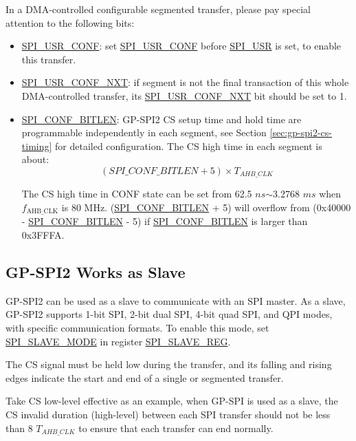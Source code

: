 \documentclass[main\_\_EN.tex]{subfiles}
\begin{document}
In a DMA-controlled configurable segmented transfer, please pay special attention to the following bits:
\begin{itemize}
    \item \hyperref[fielddesc:SPIUSRCONF]{SPI\_USR\_CONF}: set \hyperref[fielddesc:SPIUSRCONF]{SPI\_USR\_CONF} before \hyperref[fielddesc:SPIUSR]{SPI\_USR} is set, to enable this transfer.
    \item \hyperref[fielddesc:SPIUSRCONFNXT]{SPI\_USR\_CONF\_NXT}: if segment  is not the final transaction of this whole DMA-controlled transfer, its \hyperref[fielddesc:SPIUSRCONFNXT]{SPI\_USR\_CONF\_NXT} bit should be set to 1.
    \item \hyperref[fielddesc:SPICONFBITLEN]{SPI\_CONF\_BITLEN}: GP-SPI2 CS setup time and hold time are programmable independently in each segment, see Section \ref{sec:gp-spi2-cs-timing} for detailed configuration. The CS high time in each segment is about:
    \[
    (\hyperref[fielddesc:SPICONFBITLEN]{SPI\_CONF\_BITLEN} + 5) \times T_{AHB\_CLK}
    \]

The CS high time in CONF state can be set from 62.5 $ns$$\sim$3.2768 $ms$ when $f_{\textrm{AHB\_CLK}}$  is 80 MHz.
(\hyperref[fielddesc:SPICONFBITLEN]{SPI\_CONF\_BITLEN} + 5) will overflow from (0x40000 - \hyperref[fielddesc:SPICONFBITLEN]{SPI\_CONF\_BITLEN} - 5) if \hyperref[fielddesc:SPICONFBITLEN]{SPI\_CONF\_BITLEN} is larger than 0x3FFFA.
\end{itemize}

\subsection{GP-SPI2 Works as Slave}\label{sec:gp-spi2-slave-mode}

GP-SPI2 can be used as a slave to communicate with an SPI master. As a slave, GP-SPI2 supports 1-bit SPI, 2-bit dual SPI, 4-bit quad SPI, and QPI modes, with specific communication formats. To enable this mode, set \hyperref[fielddesc:SPISLAVEMODE]{SPI\_SLAVE\_MODE} in register \hyperref[regdesc:SPISLAVEREG]{SPI\_SLAVE\_REG}.

The CS signal must be held low during the transfer, and its falling and rising edges indicate the start and end of a single or segmented transfer. 

Take CS low-level effective as an example, when GP-SPI is used as a slave, the CS invalid duration (high-level) between each SPI transfer should not be less than 8 $T_{AHB\_CLK}$ to ensure that each transfer can end normally.
\end{document}
